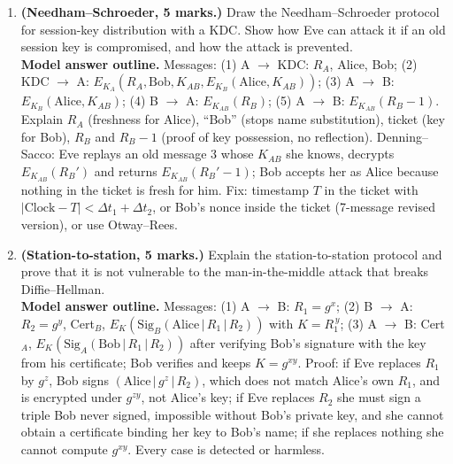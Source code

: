 \begin{enumerate}[leftmargin=1.6em,itemsep=4pt]
  \item \textbf{(Needham--Schroeder, 5 marks.)} Draw the Needham--Schroeder protocol for session-key distribution with a KDC. Show how Eve can attack it if an old session key is compromised, and how the attack is prevented.\\
  \textbf{Model answer outline.} Messages: (1) A $\to$ KDC: $R_A$, Alice, Bob; (2) KDC $\to$ A: $E_{K_A}(R_A, \text{Bob}, K_{AB}, E_{K_B}(\text{Alice}, K_{AB}))$; (3) A $\to$ B: $E_{K_B}(\text{Alice}, K_{AB})$; (4) B $\to$ A: $E_{K_{AB}}(R_B)$; (5) A $\to$ B: $E_{K_{AB}}(R_B - 1)$. Explain $R_A$ (freshness for Alice), ``Bob'' (stops name substitution), ticket (key for Bob), $R_B$ and $R_B - 1$ (proof of key possession, no reflection). Denning--Sacco: Eve replays an old message 3 whose $K_{AB}$ she knows, decrypts $E_{K_{AB}}(R_B')$ and returns $E_{K_{AB}}(R_B' - 1)$; Bob accepts her as Alice because nothing in the ticket is fresh for him. Fix: timestamp $T$ in the ticket with $|\text{Clock} - T| < \Delta t_1 + \Delta t_2$, or Bob's nonce inside the ticket (7-message revised version), or use Otway--Rees.

  \item \textbf{(Station-to-station, 5 marks.)} Explain the station-to-station protocol and prove that it is not vulnerable to the man-in-the-middle attack that breaks Diffie--Hellman.\\
  \textbf{Model answer outline.} Messages: (1) A $\to$ B: $R_1 = g^x$; (2) B $\to$ A: $R_2 = g^y$, Cert$_B$, $E_K(\text{Sig}_B(\text{Alice} \,|\, R_1 \,|\, R_2))$ with $K = R_1^{\,y}$; (3) A $\to$ B: Cert$_A$, $E_K(\text{Sig}_A(\text{Bob} \,|\, R_1 \,|\, R_2))$ after verifying Bob's signature with the key from his certificate; Bob verifies and keeps $K = g^{xy}$. Proof: if Eve replaces $R_1$ by $g^z$, Bob signs $(\text{Alice} \,|\, g^z \,|\, R_2)$, which does not match Alice's own $R_1$, and is encrypted under $g^{zy}$, not Alice's key; if Eve replaces $R_2$ she must sign a triple Bob never signed, impossible without Bob's private key, and she cannot obtain a certificate binding her key to Bob's name; if she replaces nothing she cannot compute $g^{xy}$. Every case is detected or harmless.


\end{enumerate}
